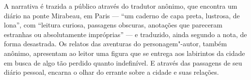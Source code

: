 A narrativa é trazida a público através do tradutor anônimo, que encontra um diário na ponte Mirabeau, em Paris --- ``um caderno de capa preta, lustrosa, de lona'', com ``leitura curiosa, passagens obscuras, anotações que pareceram estranhas ou absolutamente impróprias'' --- e traduzido, ainda segundo a nota, de forma desastrada. Os relatos das aventuras do personagem"-autor, também anônimo, apresentam ao leitor uma figura que se entrega aos labirintos da cidade em busca de algo tão perdido quanto indefinível. E através das passagens de seu diário pessoal, encarna o olhar do errante sobre a cidade e suas relações.

\vfill

\hspace*{-.4cm}\begin{minipage}[c]{1\linewidth}
\small{
{}}
\end{minipage}

\pagebreak

\vspace*{1.5cm}


\bigskip

\hfill{}

\bigskip
\bigskip
\bigskip


